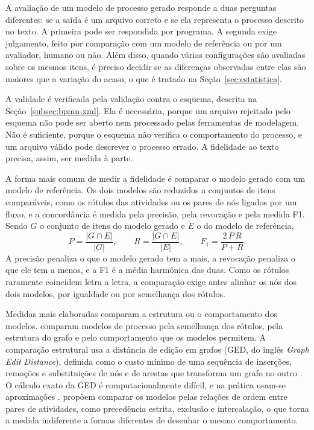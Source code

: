 A avaliação de um modelo de processo gerado responde a duas perguntas diferentes: se a saída é um arquivo correto e se ela representa o processo descrito no texto. A primeira pode ser respondida por programa. A segunda exige julgamento, feito por comparação com um modelo de referência ou por um avaliador, humano ou não. Além disso, quando várias configurações são avaliadas sobre os mesmos itens, é preciso decidir se as diferenças observadas entre elas são maiores que a variação do acaso, o que é tratado na Seção~\ref{sec:estatistica}.

A validade é verificada pela validação contra o esquema, descrita na Seção~\ref{subsec:bpmn-xml}. Ela é necessária, porque um arquivo rejeitado pelo esquema não pode ser aberto nem processado pelas ferramentas de modelagem. Não é suficiente, porque o esquema não verifica o comportamento do processo, e um arquivo válido pode descrever o processo errado. A fidelidade ao texto precisa, assim, ser medida à parte.

A forma mais comum de medir a fidelidade é comparar o modelo gerado com um modelo de referência. Os dois modelos são reduzidos a conjuntos de itens comparáveis, como os rótulos das atividades ou os pares de nós ligados por um fluxo, e a concordância é medida pela precisão, pela revocação e pela medida F1. Sendo $G$ o conjunto de itens do modelo gerado e $E$ o do modelo de referência,
\begin{equation}
	P = \frac{|G \cap E|}{|G|}, \qquad
	R = \frac{|G \cap E|}{|E|}, \qquad
	F_1 = \frac{2 \, P \, R}{P + R}.
\end{equation}
A precisão penaliza o que o modelo gerado tem a mais, a revocação penaliza o que ele tem a menos, e a F1 é a média harmônica das duas. Como os rótulos raramente coincidem letra a letra, a comparação exige antes alinhar os nós dos dois modelos, por igualdade ou por semelhança dos rótulos.

Medidas mais elaboradas comparam a estrutura ou o comportamento dos modelos.  comparam modelos de processo pela semelhança dos rótulos, pela estrutura do grafo e pelo comportamento que os modelos permitem. A comparação estrutural usa a distância de edição em grafos (GED, do inglês \textit{Graph Edit Distance}), definida como o custo mínimo de uma sequência de inserções, remoções e substituições de nós e de arestas que transforma um grafo no outro \cite{sanfeliu1983distance}. O cálculo exato da GED é computacionalmente difícil, e na prática usam-se aproximações \cite{gao2010graph}.  propõem comparar os modelos pelas relações de ordem entre pares de atividades, como precedência estrita, exclusão e intercalação, o que torna a medida indiferente a formas diferentes de desenhar o mesmo comportamento.

